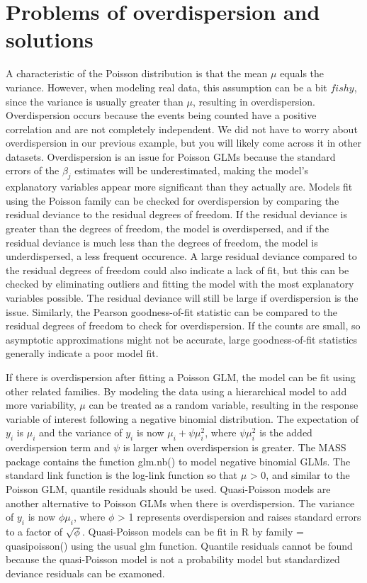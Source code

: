 \documentclass[
]{book}
\begin{document}
\hypertarget{problems-of-overdispersion-and-solutions}{%
\section{Problems of overdispersion and solutions}\label{problems-of-overdispersion-and-solutions}}

A characteristic of the Poisson distribution is that the mean \(\mu\) equals the variance. However, when modeling real data, this assumption can be a bit \({fishy}\), since the variance is usually greater than \(\mu\), resulting in overdispersion. Overdispersion occurs because the events being counted have a positive correlation and are not completely independent. We did not have to worry about overdispersion in our previous example, but you will likely come across it in other datasets. Overdispersion is an issue for Poisson GLMs because the standard errors of the \(\beta_j\) estimates will be underestimated, making the model's explanatory variables appear more significant than they actually are. Models fit using the Poisson family can be checked for overdispersion by comparing the residual deviance to the residual degrees of freedom. If the residual deviance is greater than the degrees of freedom, the model is overdispersed, and if the residual deviance is much less than the degrees of freedom, the model is underdispersed, a less frequent occurence. A large residual deviance compared to the residual degrees of freedom could also indicate a lack of fit, but this can be checked by eliminating outliers and fitting the model with the most explanatory variables possible. The residual deviance will still be large if overdispersion is the issue. Similarly, the Pearson goodness-of-fit statistic can be compared to the residual degrees of freedom to check for overdispersion. If the counts are small, so asymptotic approximations might not be accurate, large goodness-of-fit statistics generally indicate a poor model fit.

If there is overdispersion after fitting a Poisson GLM, the model can be fit using other related families. By modeling the data using a hierarchical model to add more variability, \(\mu\) can be treated as a random variable, resulting in the response variable of interest following a negative binomial distribution. The expectation of \(y_i\) is \(\mu_i\) and the variance of \(y_i\) is now \(\mu_i + \psi\mu_i^2\), where \(\psi\mu_i^2\) is the added overdispersion term and \(\psi\) is larger when overdispersion is greater. The MASS package contains the function glm.nb() to model negative binomial GLMs. The standard link function is the log-link function so that \(\mu\) \textgreater{} 0, and similar to the Poisson GLM, quantile residuals should be used. Quasi-Poisson models are another alternative to Poisson GLMs when there is overdispersion. The variance of \(y_i\) is now \(\phi\mu_i\), where \(\phi\) \textgreater{} 1 represents overdispersion and raises standard errors to a factor of \(\sqrt{\phi}\). Quasi-Poisson models can be fit in R by family = quasipoisson() using the usual glm function. Quantile residuals cannot be found because the quasi-Poisson model is not a probability model but standardized deviance residuals can be examoned.

  
\end{document}
